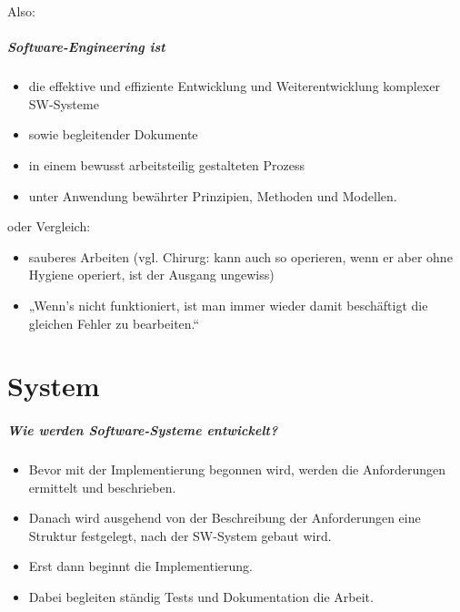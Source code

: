 Also:

\paragraph{Software-Engineering ist}
\begin{itemize}
\item die effektive und effiziente Entwicklung und Weiterentwicklung komplexer SW-Systeme
\item sowie begleitender Dokumente
\item in einem bewusst arbeitsteilig gestalteten Prozess
\item unter Anwendung bewährter Prinzipien, Methoden und Modellen.
\end{itemize}
oder Vergleich:
\begin{itemize}
\item sauberes Arbeiten (vgl. Chirurg: kann auch so operieren, wenn er aber ohne Hygiene operiert, ist der Ausgang ungewiss)
\item „Wenn's nicht funktioniert, ist man immer wieder damit beschäftigt die gleichen Fehler zu bearbeiten.“
\end{itemize}


\chapter{System}

\paragraph{Wie werden Software-Systeme entwickelt?}
\begin{itemize}
\item Bevor mit der Implementierung begonnen wird, werden die Anforderungen ermittelt und beschrieben.
\item Danach wird ausgehend von der Beschreibung der Anforderungen eine Struktur festgelegt, nach der SW-System gebaut wird.
\item Erst dann beginnt die Implementierung.
\item Dabei begleiten ständig Tests und Dokumentation die Arbeit.
\end{itemize}

